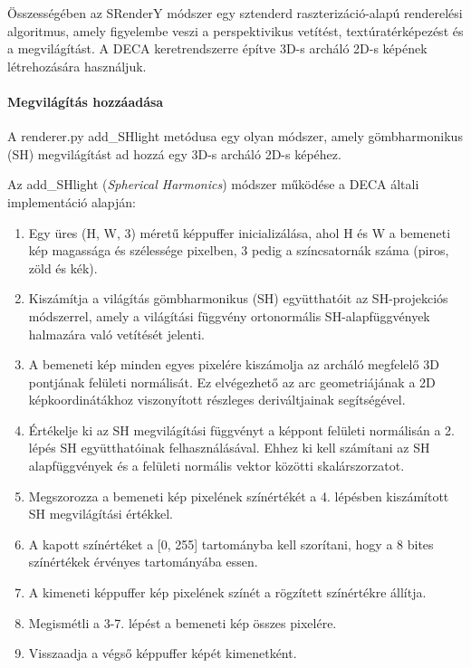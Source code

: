 \documentclass[12pt,a4]{article}
\begin{document}
            Összességében az SRenderY módszer egy sztenderd raszterizáció-alapú renderelési algoritmus, amely figyelembe veszi a perspektivikus vetítést,
            textúratérképezést és a megvilágítást. A DECA keretrendszerre építve 3D-s archáló 2D-s képének létrehozására használjuk.

        \paragraph{Megvilágítás hozzáadása}
            A renderer.py add\_SHlight metódusa egy olyan módszer, amely gömbharmonikus (SH) megvilágítást ad hozzá egy 3D-s archáló 2D-s képéhez.

            Az add\_SHlight (\textit{Spherical Harmonics}) módszer működése a DECA \cite{deca} általi implementáció alapján:
            
            \begin{enumerate}
                \item Egy üres (H, W, 3) méretű képpuffer inicializálása, ahol H és W a bemeneti kép magassága és szélessége pixelben, 3 pedig a színcsatornák száma (piros, zöld és kék).
            
                \item Kiszámítja a világítás gömbharmonikus (SH) együtthatóit az SH-projekciós módszerrel, amely a világítási függvény ortonormális SH-alapfüggvények halmazára való vetítését jelenti.
            
                \item A bemeneti kép minden egyes pixelére kiszámolja az archáló megfelelő 3D pontjának felületi normálisát. Ez elvégezhető az arc geometriájának a 2D képkoordinátákhoz viszonyított részleges deriváltjainak segítségével.
            
                \item Értékelje ki az SH megvilágítási függvényt a képpont felületi normálisán a 2. lépés SH együtthatóinak felhasználásával. Ehhez ki kell számítani az SH alapfüggvények és a felületi normális vektor közötti skalárszorzatot.
            
                \item Megszorozza a bemeneti kép pixelének színértékét a 4. lépésben kiszámított SH megvilágítási értékkel.
            
                \item A kapott színértéket a [0, 255] tartományba kell szorítani, hogy a 8 bites színértékek érvényes tartományába essen.
            
                \item A kimeneti képpuffer kép pixelének színét a rögzített színértékre állítja.
            
                \item Megismétli a 3-7. lépést a bemeneti kép összes pixelére.
            
                \item Visszaadja a végső képpuffer képét kimenetként.
            
                
            \end{enumerate}
            
\end{document}

